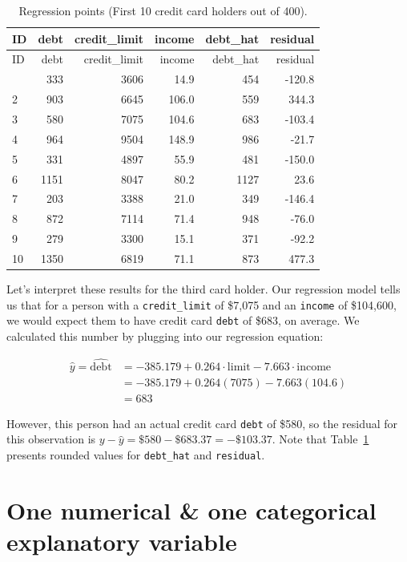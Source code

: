 \documentclass[
  letterpaper,
  DIV=11,
  numbers=noendperiod]{scrreprt}
\theoremstyle{definition}
\theoremstyle{remark}
\begin{document}
\hypertarget{tbl-model3-points-table}{}
\begin{longtable}[]{@{}lrrrrr@{}}
\caption{\label{tbl-model3-points-table}Regression points (First 10
credit card holders out of 400).}\tabularnewline
\toprule\noalign{}
ID & debt & credit\_limit & income & debt\_hat & residual \\
\midrule\noalign{}
\endfirsthead
\toprule\noalign{}
ID & debt & credit\_limit & income & debt\_hat & residual \\
\midrule\noalign{}
\endhead
\bottomrule\noalign{}
\endlastfoot
1 & 333 & 3606 & 14.9 & 454 & -120.8 \\
2 & 903 & 6645 & 106.0 & 559 & 344.3 \\
3 & 580 & 7075 & 104.6 & 683 & -103.4 \\
4 & 964 & 9504 & 148.9 & 986 & -21.7 \\
5 & 331 & 4897 & 55.9 & 481 & -150.0 \\
6 & 1151 & 8047 & 80.2 & 1127 & 23.6 \\
7 & 203 & 3388 & 21.0 & 349 & -146.4 \\
8 & 872 & 7114 & 71.4 & 948 & -76.0 \\
9 & 279 & 3300 & 15.1 & 371 & -92.2 \\
10 & 1350 & 6819 & 71.1 & 873 & 477.3 \\
\end{longtable}

Let's interpret these results for the third card holder. Our regression
model tells us that for a person with a \texttt{credit\_limit} of
\$7,075 and an \texttt{income} of \$104,600, we would expect them to
have credit card \texttt{debt} of \$683, on average. We calculated this
number by plugging into our regression equation:

\[
\begin{aligned}
\widehat{y} = \widehat{\text{debt}} &= -385.179 + 0.264 \cdot \text{limit} - 7.663 \cdot \text{income} \\
&= -385.179 + 0.264(7075) - 7.663(104.6) \\
&= 683
\end{aligned}
\]

However, this person had an actual credit card \texttt{debt} of \$580,
so the residual for this observation is
\(y - \widehat{y} = \$580 - \$683.37 = -\$103.37\). Note that
Table~\ref{tbl-model3-points-table} presents rounded values for
\texttt{debt\_hat} and \texttt{residual}.

\hypertarget{sec-model4}{%
\section{One numerical \& one categorical explanatory
variable}\label{sec-model4}}
\end{document}
